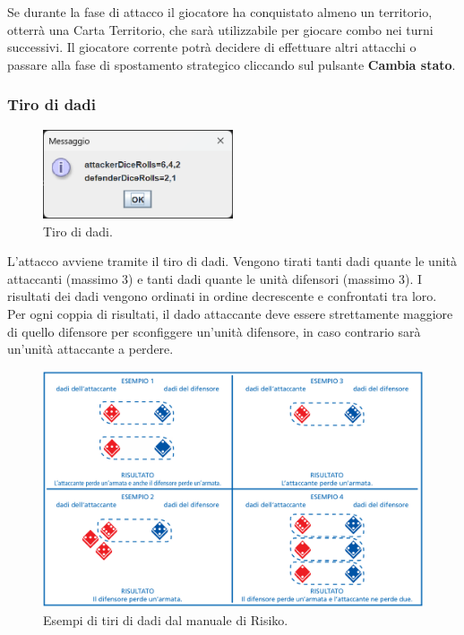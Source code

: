 \documentclass[a4paper,12pt]{report}
\begin{document}
Se durante la fase di attacco il giocatore ha conquistato almeno un territorio, otterrà una Carta Territorio, che sarà utilizzabile per giocare combo nei turni successivi.
Il giocatore corrente potrà decidere di effettuare altri attacchi o passare alla fase di spostamento strategico cliccando sul pulsante \textbf{Cambia stato}.

\subsubsection{Tiro di dadi}
\begin{figure}[H]
	\centering
	\includegraphics[width=0.5\textwidth]{user_guide/10_dice_rolls.png}
	\caption{Tiro di dadi.}
\end{figure}

L'attacco avviene tramite il tiro di dadi.
Vengono tirati tanti dadi quante le unità attaccanti (massimo 3) e tanti dadi quante le unità difensori (massimo 3).
I risultati dei dadi vengono ordinati in ordine decrescente e confrontati tra loro.
Per ogni coppia di risultati, il dado attaccante deve essere strettamente maggiore di quello difensore per sconfiggere un'unità difensore, in caso contrario sarà un'unità attaccante a perdere.
\begin{figure}[H]
	\centering
	\includegraphics[width=1\textwidth]{user_guide/11_dice_rolls_examples.png}
	\caption{Esempi di tiri di dadi dal manuale di Risiko.}
\end{figure}
\end{document}
